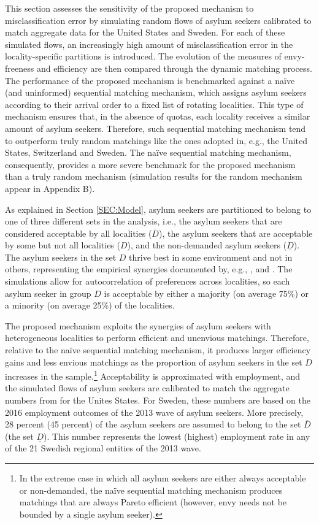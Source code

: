 \documentclass[12pt,fleqn]{article}
\begin{document}
This section assesses the sensitivity of the proposed mechanism to misclassification error by simulating random flows of asylum seekers calibrated to match aggregate data for the United States and Sweden. For each of these simulated flows, an increasingly high amount of misclassification error in the locality-specific partitions is introduced. The evolution of the measures of envy-freeness and efficiency are then compared through the dynamic matching process. The performance of the proposed mechanism is benchmarked against a na\"{i}ve (and uninformed) sequential matching mechanism, which assigns asylum seekers according to their arrival order to a fixed list of rotating localities. This type of mechanism ensures that, in the absence of quotas, each locality receives a similar amount of asylum seekers. Therefore, such sequential matching mechanism tend to outperform truly random matchings like the ones adopted in, e.g., the United States, Switzerland and Sweden. The na\"{i}ve sequential matching mechanism, consequently, provides a more severe benchmark for the proposed mechanism than a truly random mechanism (simulation results for the random mechanism appear in Appendix B).

As explained in Section \ref{SEC:Model}, asylum seekers are partitioned to belong to one of three different sets in the analysis, i.e., the asylum seekers that are considered acceptable by all localities ($\overline{D}$), the asylum seekers that are acceptable by some but not all localities ($D$), and the non-demanded asylum seekers ($\underline{D}$). The asylum seekers in the set $D$ thrive best in some environment and not in others, representing the empirical synergies documented by, e.g., \cite{bib:BansakEtAl}, \citet{bib:Damm} and \citet{bib:EdinEtAl}. The simulations allow for autocorrelation of preferences across localities, so each asylum seeker in group $D$ is acceptable by either a majority (on average 75\%) or a minority (on average 25\%) of the localities.

The proposed mechanism exploits the synergies of asylum seekers with heterogeneous localities to perform efficient and unenvious matchings. Therefore, relative to the na\"{i}ve sequential matching mechanism, it produces larger efficiency gains and less envious matchings as the proportion of asylum seekers in the set $D$ increases in the sample.\footnote{In the extreme case in which all asylum seekers are either always acceptable or non-demanded, the na\"{i}ve sequential matching mechanism produces matchings that are always Pareto efficient (however, envy needs not be bounded by a single asylum seeker).} Acceptability is approximated with employment, and the simulated flows of asylum seekers are calibrated to match the aggregate numbers from \cite{bib:BansakEtAl} for the Unites States. For Sweden, these numbers are based on the 2016 employment outcomes of the 2013 wave of asylum seekers. More precisely, 28 percent (45 percent) of the asylum seekers are assumed to belong to the set $\overline{D}$ (the set $\underline{D}$). This number represents the lowest (highest) employment rate in any of the 21 Swedish regional entities of the 2013 wave.
\end{document}
